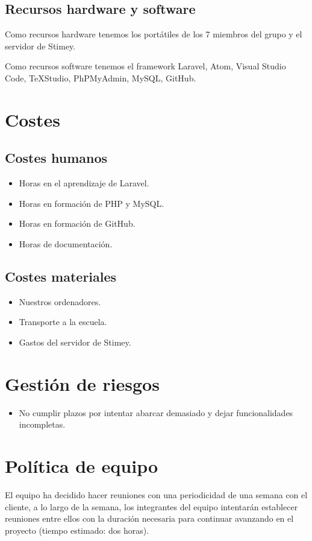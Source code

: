 \subsection{Recursos hardware y software}
Como recursos hardware tenemos los portátiles de los 7 miembros del grupo y el servidor de Stimey.

Como recursos software tenemos el framework Laravel, Atom, Visual Studio Code, TeXStudio, PhPMyAdmin, MySQL, GitHub.

\section{Costes}
\subsection{Costes humanos}
\begin{itemize}
	\item Horas en el aprendizaje de Laravel.
	\item Horas en formación de PHP y MySQL.
	\item Horas en formación de GitHub.
	\item Horas de documentación.
\end{itemize}

\subsection{Costes materiales}
\begin{itemize}
	\item Nuestros ordenadores.
	\item Transporte a la escuela.
	\item Gastos del servidor de Stimey.
\end{itemize}

\section{Gestión de riesgos}
\begin{itemize}
	\item No cumplir plazos por intentar abarcar demasiado y dejar funcionalidades incompletas.
\end{itemize}

\section{Política de equipo}
El equipo ha decidido hacer reuniones con una periodicidad de una semana con el cliente, a lo largo de la semana, los integrantes del equipo intentarán establecer reuniones entre ellos con la duración necesaria para continuar avanzando en el proyecto (tiempo estimado: dos horas).

